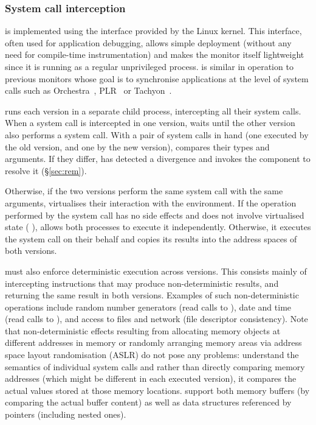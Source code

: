 \subsubsection{System call interception}

\mxm is implemented using the  \ptrace interface provided by the Linux
kernel.  This interface, often used for application debugging, allows
simple deployment (without any need for compile-time instrumentation)
and makes the monitor itself lightweight since it is running as a
regular unprivileged process.  \mxm is similar in operation to previous
monitors whose goal is to synchronise applications at the level of system
calls such as Orchestra~\cite{orchestra09}, PLR~\cite{shye2009} or
Tachyon~\cite{tachyon12}.

\mxm runs each version in a separate child process, intercepting all
their system calls.  When a system call is intercepted in one version,
\mxm waits until the other version also performs a system call.  With
a pair of system calls in hand (one executed by the old version, and
one by the new version), \mxm compares their types and arguments.  If
they differ, \mxm has detected a divergence and invokes the \rem
component to resolve it (\S\ref{sec:rem}).

Otherwise, if the two versions perform the same system call with the
same arguments, \mxm virtualises their interaction with the
environment.  If the operation performed by the system call has no
side effects and does not involve virtualised state (\eg
{}), \mxm allows both processes to execute it
independently.  Otherwise, it executes the system call on their
behalf and copies its results into the address spaces of both
versions.

\mxm must also enforce deterministic execution across versions. This
consists mainly of intercepting instructions that may produce
non-deterministic results, and returning the same result in both
versions.  Examples of such non-deterministic operations include
random number generators (\eg read calls to ),
date and time (\eg read calls to ), and access
to files and network (\eg file descriptor consistency).  Note that
non-deterministic effects resulting from allocating memory objects at
different addresses in memory or randomly arranging memory areas via
address space layout randomisation (ASLR) do not pose any
problems: \mxm understand the semantics of individual system calls and
rather than directly comparing memory addresses (which might be
different in each executed version), it compares the actual values
stored at those memory locations. \mxm support both memory buffers (by
comparing the actual buffer content) as well as data structures
referenced by pointers (including nested ones).
 
